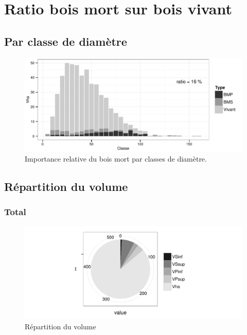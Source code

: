 \documentclass[a4paper]{book}\usepackage[]{graphicx}\usepackage[]{color}
\makeatletter
\def\maxwidth{ %
  \ifdim\Gin@nat@width>\linewidth
    \linewidth
  \else
    \Gin@nat@width
  \fi
}
\newenvironment{knitrout}{}{} %
\makeatother
\begin{document}
\section{Ratio bois mort sur bois vivant}

\subsection{Par classe de diamètre}
\begin{knitrout}\footnotesize
{}\color{fgcolor}\begin{figure}[H]


{\centering \includegraphics[width=\maxwidth]{Figures/Ratio-1} 

}

\caption[Importance relative du bois mort par classes de diamètre]{Importance relative du bois mort par classes de diamètre.\label{fig:Ratio}}
\end{figure}


\end{knitrout}

\subsection{Répartition du volume}

\subsubsection{Total}
\begin{knitrout}
\color{fgcolor}\begin{figure}[h]


{\centering \includegraphics[width=\maxwidth]{Figures/RepVol-1} 

}

\caption[Répartition du volume]{Répartition du volume\label{fig:RepVol}}
\end{figure}


\end{knitrout}
\end{document}

